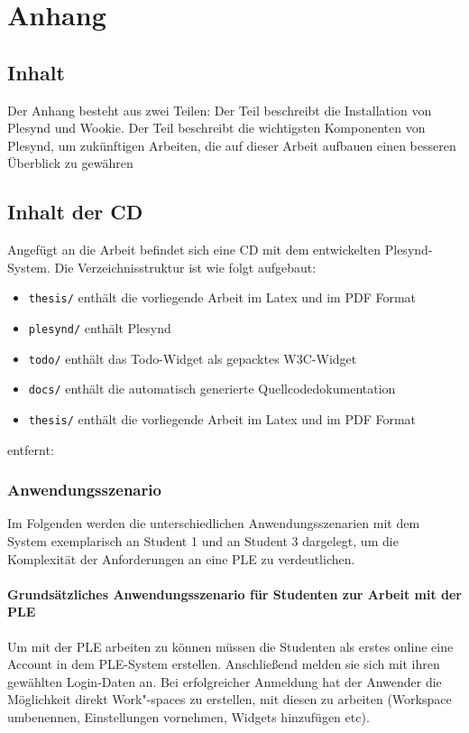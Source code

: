 \chapter{Anhang} \label{AppendixA}

\section{Inhalt} 
Der Anhang besteht aus zwei Teilen: Der Teil  beschreibt die Installation von Plesynd und Wookie. Der Teil  beschreibt die wichtigsten Komponenten von Plesynd, um zukünftigen Arbeiten, die auf dieser Arbeit aufbauen einen besseren Überblick zu gewähren

\section{Inhalt der CD}
Angefügt an die Arbeit befindet sich eine CD mit dem entwickelten Plesynd-System. Die Verzeichnisstruktur ist wie folgt aufgebaut:
\begin{itemize}
 \item \texttt{thesis/} enthält die vorliegende Arbeit im Latex und im PDF Format
 \item \texttt{plesynd/} enthält Plesynd
 \item \texttt{todo/} enthält das Todo-Widget als gepacktes W3C-Widget
 \item \texttt{docs/} enthält die automatisch generierte Quellcodedokumentation
 \item \texttt{thesis/} enthält die vorliegende Arbeit im Latex und im PDF Format
\end{itemize}


entfernt:


\subsection{Anwendungsszenario}
Im Folgenden werden die unterschiedlichen Anwendungsszenarien mit dem System exemplarisch an Student 1 und an Student 3 dargelegt, um die Komplexität der Anforderungen an eine PLE zu verdeutlichen.

\subsubsection*{Grundsätzliches Anwendungsszenario für Studenten zur Arbeit mit der PLE}
Um mit der PLE arbeiten zu können müssen die Studenten als erstes online eine Account in dem PLE-System erstellen. Anschließend melden sie sich mit ihren gewählten Login-Daten an. Bei erfolgreicher Anmeldung hat der Anwender die Möglichkeit direkt Work"-spaces zu erstellen, mit diesen zu arbeiten (Workspace umbenennen, Einstellungen vornehmen, Widgets hinzufügen etc).

